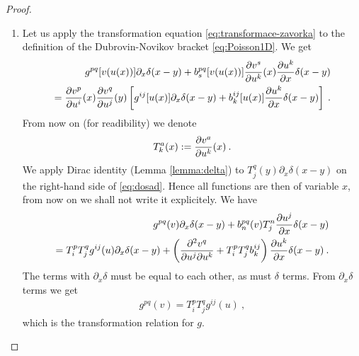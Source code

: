 \begin{proof}
    \begin{enumerate}
        \item Let us apply the transformation equation \eqref{eq:transformace-zavorka} to the definition of the Dubrovin-Novikov bracket \eqref{eq:Poisson1D}. We get 
        \begin{align}
            g^{pq}[v(u(x))] \partial_x \delta(x-y) + b^{pq}_s[v(u(x))] \frac{\partial v^s}{\partial u^k}(x) \frac{\partial u^k}{\partial x} \delta(x-y) \nonumber
            \\ = \frac{\partial v^p}{\partial u^i}(x) \frac{\partial v^q}{\partial u^j}(y) \left[ g^{ij}[u(x)] \partial_x \delta(x-y) + b^{ij}_k[u(x)] \frac{\partial u^k}{\partial x} \delta(x-y) \right] \:. \label{eq:dosad}
        \end{align}
        From now on (for readibility) we denote 
        \begin{align}
            T^a_k(x) := \frac{\partial v^a}{\partial u^k}(x) \:.
        \end{align}
        We apply Dirac identity (Lemma \vref{lemma:delta}) to $T^q_j(y) \partial_x \delta(x-y)$ on the right-hand side of \eqref{eq:dosad}. Hence all functions are then of variable $x$, from now on we shall not write it explicitely. We have
        \begin{align}
            g^{pq}(v) \partial_x \delta(x-y) + b^{pq}_n(v) T^n_j \frac{\partial u^j}{\partial x} \delta(x-y) \nonumber
            \\ = T^p_i T^q_j g^{ij}(u) \partial_x \delta(x-y) 
            + \left( \frac{\partial^2 v^q}{\partial u^j \partial u^k} + T^p_i T^q_j b^{ij}_k \right) \frac{\partial u^k}{\partial x} \delta(x-y) \:. \label{eq:porovnani}
        \end{align}
        The terms with $\partial_x \delta$ must be equal to each other, as must $\delta$ terms. From $\partial_x \delta$ terms we get
        \begin{align}
            g^{pq}(v) = T^p_i T^q_j g^{ij}(u) \:,
        \end{align}
        which is the transformation relation for $g$.


\end{enumerate}
\end{proof}
